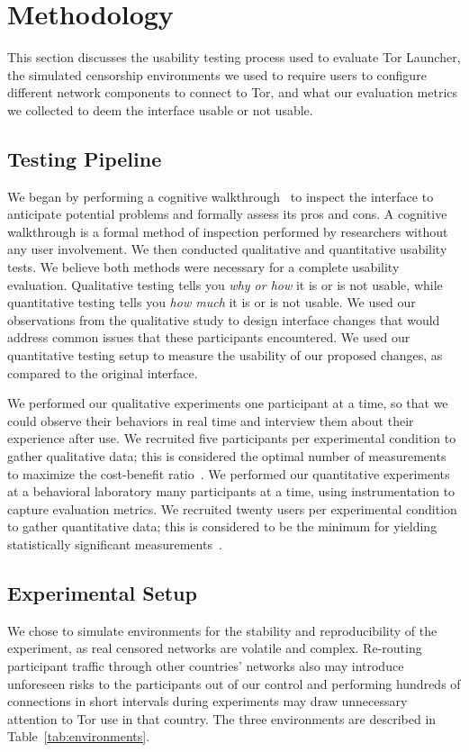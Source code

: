 \documentclass[USenglish,oneside,twocolumn]{article}
\begin{document}
\section{Methodology} 
This section discusses the usability testing process used to evaluate Tor Launcher, the simulated censorship environments we used to require users to configure different network components to connect to Tor, and what our evaluation metrics  we collected to deem the interface usable or not usable.

\subsection{Testing Pipeline} 
We began by performing a cognitive walkthrough~\cite{wharton1994cognitive,cognitive-walkthrough} to inspect the interface to anticipate potential problems and formally assess its pros and cons. A cognitive walkthrough is a formal method of inspection performed by researchers without any user involvement. We then conducted qualitative and quantitative usability tests. We believe both methods were necessary for a complete usability evaluation. Qualitative testing tells you {\it why or how} it is or is not usable, while quantitative testing tells you {\it how much} it is or is not usable. We used our observations from the qualitative study to design interface changes that would address common issues that these participants encountered. We used our quantitative testing setup to measure the usability of our proposed changes, as compared to the original interface.

We performed our qualitative experiments one participant at a time, so that we could observe their behaviors in real time and interview them about their experience after use. We recruited five participants per experimental condition to gather qualitative data; this is considered the optimal number of measurements to maximize the cost-benefit ratio~\cite{howmanyusers}. We performed our quantitative experiments at a behavioral laboratory many participants at a time, using instrumentation to capture evaluation metrics. We recruited twenty users per experimental condition to gather quantitative data; this is considered to be the minimum for yielding statistically significant measurements~\cite{howmanyusers}. 

\subsection{Experimental Setup}
\label{sec:environments}
We chose to simulate environments for the stability and reproducibility of the experiment, as real censored networks are volatile and complex. Re-routing participant traffic through other countries' networks also may introduce unforeseen risks to the participants out of our control and performing hundreds of connections in short intervals during experiments may draw unnecessary attention to Tor use in that country. The three environments are described in Table~\ref{tab:environments}.
\end{document}

